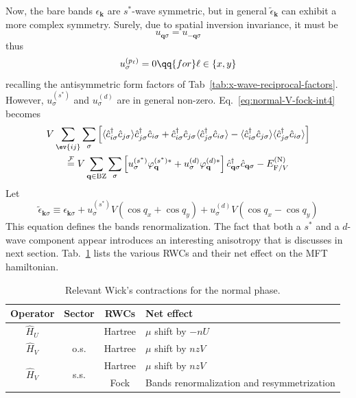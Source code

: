 Now, the bare bands $\epsilon_\mathbf{k}$ are $s^*$-wave symmetric, but in general $\tilde{\epsilon}_\mathbf{k}$ can exhibit a more complex symmetry. Surely, due to spatial inversion invariance, it must be
\[
	u_{\mathbf{q}\sigma} = u_{-\mathbf{q}\sigma}
\]
thus
\[
	u_\sigma^{(p_\ell)} = 0
	\qq{for}
	\ell\in\lbrace x,y \rbrace
\]
recalling the antisymmetric form factors of Tab~\ref{tab:x-wave-reciprocal-factors}. However, $u_\sigma^{(s^*)}$ and $u_\sigma^{(d)}$ are in general non-zero. Eq.~\eqref{eq:normal-V-fock-int4} becomes
\begin{multline}
	V \sum_{\ev{ij}} \sum_\sigma \left[
	\langle
	\hat c_{i\sigma}^\dagger \hat c_{j\sigma}
	\rangle \hat c_{j\sigma}^\dagger  \hat c_{i\sigma} + 
	\hat c_{i\sigma}^\dagger \hat c_{j\sigma}
	\langle \hat c_{j\sigma}^\dagger  \hat c_{i\sigma} \rangle - \langle \hat c_{i\sigma}^\dagger \hat c_{j\sigma}
	\rangle \langle \hat c_{j\sigma}^\dagger  \hat c_{i\sigma} \rangle
	\right] \\
	\stackrel{\mathcal{F}}{=} V
	\sum_{\mathbf{q}\in\mathrm{BZ}} \sum_\sigma
	\left[
		u^{(s^*)}_\sigma
		\varphi_\mathbf{q}^{(s^*)*} + u^{(d)}_\sigma
		\varphi_\mathbf{q}^{(d)*}
	\right]
	\hat c_{\mathbf{q}\sigma}^\dagger
	\hat c_{\mathbf{q}\sigma} - E_{\mathrm{F}/V}^{(\mathrm{N})} \label{eq:normal-V-fock-int5}
\end{multline}
Let
\begin{equation}\label{eq:normal-bands-renormalization}
	\tilde{\epsilon}_{\mathbf{k}\sigma} \equiv \epsilon_{\mathbf{k}\sigma} + u^{(s^*)}_\sigma V (\cos q_x + \cos q_y) + u^{(d)}_\sigma V (\cos q_x - \cos q_y)
\end{equation}
This equation defines the bands renormalization. The fact that both a $s^*$ and a $d$-wave component appear introduces an interesting anisotropy that is discusses in next section. Tab.~\ref{tab:normal-RWCs} lists the various RWCs and their net effect on the MFT hamiltonian.

\begin{table}
	\centering
	\begin{tabular}{c c c l}
		\textbf{Operator} & \textbf{Sector} & \textbf{RWCs} & \textbf{Net effect} \\
		\midrule
		$\hat H_U$ && Hartree & $\mu$ shift by $-nU$ \\[0.5em]
		$\hat H_V$ & o.s. & Hartree & $\mu$ shift by $nzV$ \\[0.5em]
		\multirow{2}{*}{$\hat H_V$} & \multirow{2}{*}{s.s.} & Hartree & $\mu$ shift by $nzV$\\
		&& Fock & Bands renormalization and resymmetrization \\
		\midrule
	\end{tabular}
	\caption{Relevant Wick's contractions for the normal phase.}
	\label{tab:normal-RWCs}
\end{table}

